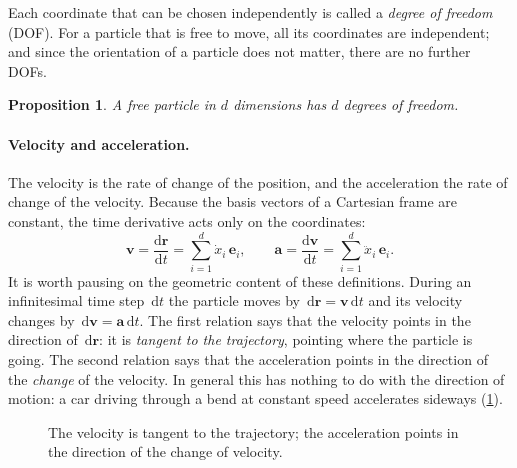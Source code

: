 \documentclass[11pt,a4paper,oneside]{report}
\numberwithin{equation}{chapter}
\newcommand{\vect}[1]{\bm{#1}}
\newcommand{\e}[1]{\vect{e}_{#1}}
\newcommand{\dd}{\,\mathrm{d}}
\newcommand{\dv}[2]{\frac{\mathrm{d}#1}{\mathrm{d}#2}}
\theoremstyle{plain}
\newtheorem{proposition}[theorem]{Proposition}
\theoremstyle{definition}
\theoremstyle{remark}
\begin{document}
Each coordinate that can be chosen independently is called a \emph{degree of freedom} (DOF). For a particle that
is free to move, all its coordinates are independent; and since the orientation of a particle does not matter,
there are no further DOFs.

\begin{proposition}
A free particle in $d$ dimensions has $d$ degrees of freedom.
\end{proposition}

\paragraph{Velocity and acceleration.}
The velocity is the rate of change of the position, and the acceleration the rate of change of the velocity.
Because the basis vectors of a Cartesian frame are constant, the time derivative acts only on the coordinates:
\begin{equation}
  \vect v=\dv{\vect r}{t}=\sum_{i=1}^{d}\dot x_i\,\e i,\qquad
  \vect a=\dv{\vect v}{t}=\sum_{i=1}^{d}\ddot x_i\,\e i .
\end{equation}
It is worth pausing on the geometric content of these definitions. During an infinitesimal time step $\dd t$
the particle moves by $\dd\vect r=\vect v\dd t$ and its velocity changes by $\dd\vect v=\vect a\dd t$. The first
relation says that the velocity points in the direction of $\dd\vect r$: it is \emph{tangent to the trajectory},
pointing where the particle is going. The second relation says that the acceleration points in the direction of the
\emph{change} of the velocity. In general this has nothing to do with the direction of motion: a car driving
through a bend at constant speed accelerates sideways (\cref{fig:drdv}).

\begin{figure}[ht]
\centering
{}
\caption{The velocity is tangent to the trajectory; the acceleration points in the direction of the change of velocity.}
\label{fig:drdv}
\end{figure}
\end{document}
